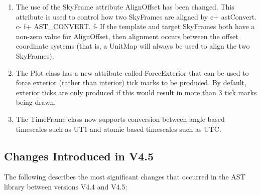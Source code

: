 \documentclass[twoside,11pt]{starlink}
\begin{document}
\begin{enumerate}
\item The use of the SkyFrame attribute AlignOffset has been changed. This
attribute is used to control how two SkyFrames are aligned by
c+
astConvert.
c-
f+
AST\_CONVERT.
f-
If the template and target SkyFrames both have a non-zero value for
AlignOffset, then alignment occurs between the offset coordinate systems
(that is, a UnitMap will always be used to align the two SkyFrames).

\item The Plot class has a new attribute called ForceExterior that can be
used to force exterior (rather than interior) tick marks to be produced.
By default, exterior ticks are only produced if this would result in
more than 3 tick marks being drawn.

\item The TimeFrame class now supports conversion between angle based
timescales such as UT1 and atomic based timescales such as UTC.

\end{enumerate}

\subsection{Changes Introduced in V4.5}

The following describes the most significant changes that
occurred in the AST library between versions V4.4 and V4.5:
\end{document}
